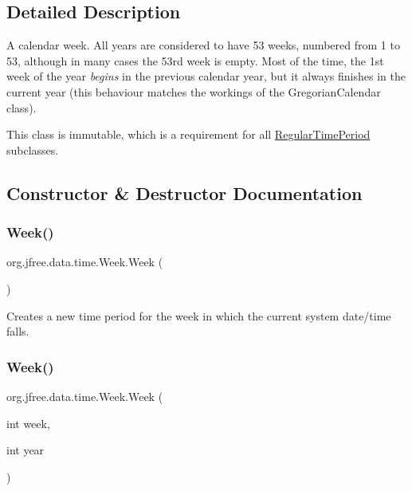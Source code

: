 \subsection{Detailed Description}
A calendar week. All years are considered to have 53 weeks, numbered from 1 to 53, although in many cases the 53rd week is empty. Most of the time, the 1st week of the year {\itshape begins} in the previous calendar year, but it always finishes in the current year (this behaviour matches the workings of the {\ttfamily Gregorian\+Calendar} class). 

This class is immutable, which is a requirement for all \mbox{\hyperlink{classorg_1_1jfree_1_1data_1_1time_1_1_regular_time_period}{Regular\+Time\+Period}} subclasses. 

\subsection{Constructor \& Destructor Documentation}
\mbox{\label{classorg_1_1jfree_1_1data_1_1time_1_1_week_ab333140995d4969e01d472b3cd2fcca5}} 
\subsubsection{\texorpdfstring{Week()}{Week()}\hspace{0.1cm}{\footnotesize\ttfamily [1/6]}}
{\footnotesize\ttfamily org.\+jfree.\+data.\+time.\+Week.\+Week (\begin{DoxyParamCaption}{ }\end{DoxyParamCaption})}

Creates a new time period for the week in which the current system date/time falls. \mbox{\label{classorg_1_1jfree_1_1data_1_1time_1_1_week_ae5e3d72098626245e3b59a63717448a4}} 
\subsubsection{\texorpdfstring{Week()}{Week()}\hspace{0.1cm}{\footnotesize\ttfamily [2/6]}}
{\footnotesize\ttfamily org.\+jfree.\+data.\+time.\+Week.\+Week (\begin{DoxyParamCaption}\item[{int}]{week,  }\item[{int}]{year }\end{DoxyParamCaption})}

